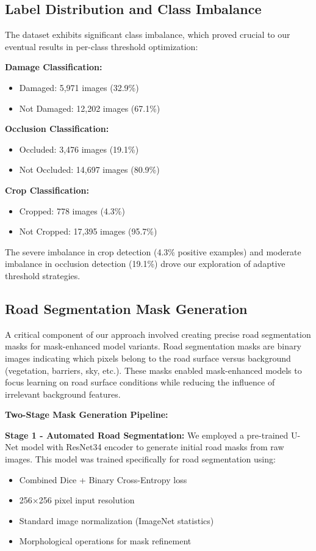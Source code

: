 \documentclass[12pt]{article}
\begin{document}
\subsection{Label Distribution and Class Imbalance}

The dataset exhibits significant class imbalance, which proved crucial to our eventual results in per-class threshold optimization:

\textbf{Damage Classification:}
\begin{itemize}[itemsep=1pt,parsep=0pt,topsep=2pt]
\item Damaged: 5,971 images (32.9\%)
\item Not Damaged: 12,202 images (67.1\%)
\end{itemize}

\textbf{Occlusion Classification:}
\begin{itemize}[itemsep=1pt,parsep=0pt,topsep=2pt]
\item Occluded: 3,476 images (19.1\%)
\item Not Occluded: 14,697 images (80.9\%)
\end{itemize}

\textbf{Crop Classification:}
\begin{itemize}[itemsep=1pt,parsep=0pt,topsep=2pt]
\item Cropped: 778 images (4.3\%)
\item Not Cropped: 17,395 images (95.7\%)
\end{itemize}

The severe imbalance in crop detection (4.3\% positive examples) and moderate imbalance in occlusion detection (19.1\%) drove our exploration of adaptive threshold strategies.

\subsection{Road Segmentation Mask Generation}

A critical component of our approach involved creating precise road segmentation masks for mask-enhanced model variants. Road segmentation masks are binary images indicating which pixels belong to the road surface versus background (vegetation, barriers, sky, etc.). These masks enabled mask-enhanced models to focus learning on road surface conditions while reducing the influence of irrelevant background features.

\textbf{Two-Stage Mask Generation Pipeline:}

\textbf{Stage 1 - Automated Road Segmentation:} We employed a pre-trained U-Net model with ResNet34 encoder to generate initial road masks from raw images. This model was trained specifically for road segmentation using:
\begin{itemize}[itemsep=1pt,parsep=0pt,topsep=2pt]
\item Combined Dice + Binary Cross-Entropy loss
\item 256×256 pixel input resolution
\item Standard image normalization (ImageNet statistics)
\item Morphological operations for mask refinement
\end{itemize}
\end{document}
